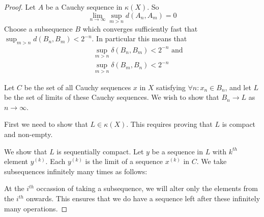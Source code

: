 \documentclass[a4paper,11pt]{article}
\begin{document}
\begin{proof}
Let $A$ be a Cauchy sequence in $\kappa(X)$.  So
\[
\lim_{n\to\infty}\sup_{m>n}d(A_n,A_m)=0
\]
Choose a subsequence $B$ which
converges sufficiently fast that $\sup_{m>n}d(B_n,B_m)<2^{-n}$.  In particular
this means that
%
\begin{eqnarray*}
&&\sup_{m>n}\delta(B_n,B_m)<2^{-n}\textrm{ and} \\
&&\sup_{m>n}\delta(B_m,B_n)<2^{-n}
\end{eqnarray*}

Let $C$ be the set of all Cauchy sequences $x$ in $X$ satisfying
$\forall n:x_n\in B_n$, and let $L$ be the set of limits of these Cauchy
sequences.  We wish to show that $B_n\to L$ as $n\to\infty$.

First we need to show that $L\in\kappa(X)$.  This requires proving that $L$ is
compact and non-empty.

We show that $L$ is sequentially compact.  Let $y$ be a sequence in $L$ with
$k^{th}$ element $y^{(k)}$.  Each
$y^{(k)}$ is the limit of a sequence $x^{(k)}$ in $C$.  We take subsequences
infinitely many times as follows:

At the $i^{th}$ occassion of taking a subsequence, we will alter only the
elements from the $i^{th}$ onwards.  This ensures that we do have a sequence
left after these infinitely many operations.


\end{proof}
\end{document}
